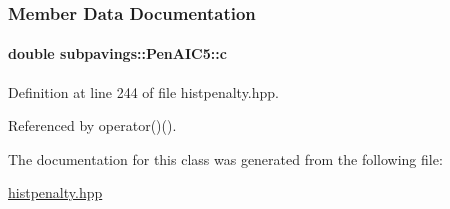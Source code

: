 \subsubsection{\-Member \-Data \-Documentation}
\hypertarget{classsubpavings_1_1PenAIC5_a778ca6554c74be689f388fe3e61c99c7}{
\paragraph[{c}]{\setlength{\rightskip}{0pt plus 5cm}double {\bf subpavings\-::\-Pen\-A\-I\-C5\-::c}}}\label{classsubpavings_1_1PenAIC5_a778ca6554c74be689f388fe3e61c99c7}


\-Definition at line 244 of file histpenalty.\-hpp.



\-Referenced by operator()().



\-The documentation for this class was generated from the following file\-:\begin{DoxyCompactItemize}
\item 
\hyperlink{histpenalty_8hpp}{histpenalty.\-hpp}\end{DoxyCompactItemize}
